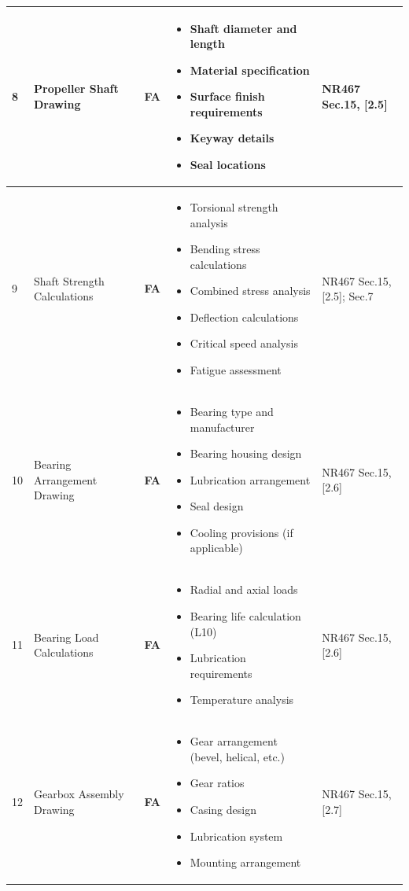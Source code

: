 \documentclass[11pt,a4paper]{report}
\newcommand{\fa}{\textbf{\textcolor{warningred}{FA}}}
\begin{document}
\begin{longtable}{|p{0.5cm}|p{5cm}|p{1.5cm}|p{5.5cm}|p{2cm}|}
8 & Propeller Shaft Drawing & \fa{} & 
\begin{itemize}[leftmargin=*,nosep]
\item Shaft diameter and length
\item Material specification
\item Surface finish requirements
\item Keyway details
\item Seal locations
\end{itemize} & NR467 Sec.15, [2.5] \\
\hline

9 & Shaft Strength Calculations & \fa{} & 
\begin{itemize}[leftmargin=*,nosep]
\item Torsional strength analysis
\item Bending stress calculations
\item Combined stress analysis
\item Deflection calculations
\item Critical speed analysis
\item Fatigue assessment
\end{itemize} & NR467 Sec.15, [2.5]; Sec.7 \\
\hline

10 & Bearing Arrangement Drawing & \fa{} & 
\begin{itemize}[leftmargin=*,nosep]
\item Bearing type and manufacturer
\item Bearing housing design
\item Lubrication arrangement
\item Seal design
\item Cooling provisions (if applicable)
\end{itemize} & NR467 Sec.15, [2.6] \\
\hline

11 & Bearing Load Calculations & \fa{} & 
\begin{itemize}[leftmargin=*,nosep]
\item Radial and axial loads
\item Bearing life calculation (L10)
\item Lubrication requirements
\item Temperature analysis
\end{itemize} & NR467 Sec.15, [2.6] \\
\hline

12 & Gearbox Assembly Drawing & \fa{} & 
\begin{itemize}[leftmargin=*,nosep]
\item Gear arrangement (bevel, helical, etc.)
\item Gear ratios
\item Casing design
\item Lubrication system
\item Mounting arrangement
\end{itemize} & NR467 Sec.15, [2.7] \\
\hline


\end{longtable}
\end{document}

